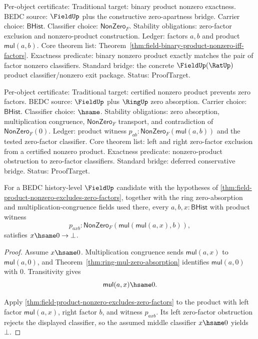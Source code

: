 Per-object certificate: Traditional target: binary product nonzero
exactness. BEDC source: $\FieldUp$ plus the constructive zero-apartness
bridge. Carrier choice: $\mathsf{BHist}$. Classifier choice:
$\mathsf{NonZero}_F$. Stability obligations: zero-factor exclusion and
nonzero-product construction. Ledger: factors $a,b$ and product
$\mathsf{mul}(a,b)$. Core theorem list:
Theorem~\ref{thm:field-binary-product-nonzero-iff-factors}. Exactness
predicate: binary nonzero product exactly matches the pair of factor
nonzero classifiers. Standard bridge: the concrete
$\FieldUp(\RatUp)$ product classifier/nonzero exit package. Status:
ProofTarget.

Per-object certificate: Traditional target: certified nonzero product
prevents zero factors. BEDC source: $\FieldUp$ plus $\RingUp$ zero
absorption. Carrier choice: $\mathsf{BHist}$. Classifier choice:
$\hsame$. Stability obligations: zero absorption, multiplication
congruence, $\mathsf{NonZero}_F$ transport, and contradiction of
$\mathsf{NonZero}_F(0)$. Ledger: product witness
$p_{ab}:\mathsf{NonZero}_F(\mathsf{mul}(a,b))$ and the tested zero-factor
classifier. Core theorem list: left and right zero-factor exclusion from a
certified nonzero product. Exactness predicate: nonzero-product obstruction
to zero-factor classifiers. Standard bridge: deferred conservative bridge.
Status: ProofTarget.

\begin{theorem}
\label{thm:field-two-sided-product-nonzero-excludes-middle-zero}
For a BEDC history-level $\FieldUp$ candidate with the hypotheses of
\autoref{thm:field-product-nonzero-excludes-zero-factors}, together with the
ring zero-absorption and multiplication-congruence fields used there, every
$a,b,x:\mathsf{BHist}$ with product witness
$$
p_{axb}:\mathsf{NonZero}_F(\mathsf{mul}(\mathsf{mul}(a,x),b)),
$$
satisfies $x\hsame0\to\bot$.
\end{theorem}
\begin{proof}
Assume $x\hsame0$. Multiplication congruence sends
$\mathsf{mul}(a,x)$ to $\mathsf{mul}(a,0)$, and
Theorem~\ref{thm:ring-mul-zero-absorption} identifies
$\mathsf{mul}(a,0)$ with $0$. Transitivity gives
$$
\mathsf{mul}(a,x)\hsame0.
$$

Apply \autoref{thm:field-product-nonzero-excludes-zero-factors} to the
product with left factor $\mathsf{mul}(a,x)$, right factor $b$, and witness
$p_{axb}$. Its left zero-factor obstruction rejects the displayed classifier,
so the assumed middle classifier $x\hsame0$ yields $\bot$.
\end{proof}

